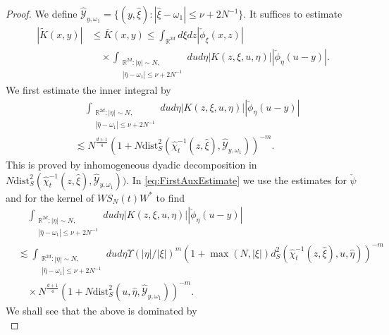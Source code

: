 \documentclass{amsart}
\numberwithin{equation}{section}
\theoremstyle{definition}
\newcommand{\R}{\mathbb{R}}
\begin{document}
\begin{proof}
We define $\hat{\mathcal{Y}}_{y,\omega_1} = \{ (y,\hat{\xi}) : |\hat{\xi} - \omega_1| \leq \nu + 2 N^{-1} \} $. It suffices to estimate
\begin{equation*}
\begin{split}
    |\tilde{K}(x,y)| &\leq \bar{K}(x,y) \leq \int_{\R^{2d}} d\xi dz |\check{\phi}_{\xi}(x,z)| \\
    &\quad \times \int_{\substack{\R^{2d}: |\eta| \sim N, \\ |\hat{\eta} - \omega_1| \leq \nu + 2 N^{-1}}} du d\eta |K(z,\xi,u,\eta)| |\check{\phi}_{\eta}(u-y)|.
\end{split}
\end{equation*}
We first estimate the inner integral by
\begin{equation}
\label{eq:FirstAuxEstimate}
\begin{split}
    &\quad \int_{\substack{\R^{2d}: |\eta| \sim N, \\ |\hat{\eta} - \omega_1| \leq \nu + 2 N^{-1}}} du d\eta |K(z,\xi,u,\eta)| |\check{\phi}_{\eta}(u-y)| \\
    &\lesssim N^{\frac{d+1}{4}} (1 + N \text{dist}_S^2(\hat{\chi}_t^{-1}(z,\hat{\xi}),\hat{\mathcal{Y}}_{y,\omega_1}))^{-m}.
\end{split}
\end{equation}
This is proved by inhomogeneous dyadic decomposition in $N \text{dist}_S^2(\hat{\chi}_t^{-1}(z,\hat{\xi}),\hat{\mathcal{Y}}_{y,\omega_1}))$. In \eqref{eq:FirstAuxEstimate} we use the estimates for $\check{\psi}$ and for the kernel of $W S_N(t) W^*$ to find
\begin{equation*}
\begin{split}
    &\quad \int_{\substack{\R^{2d}: |\eta| \sim N, \\ |\hat{\eta} - \omega_1| \leq \nu + 2 N^{-1}}} du d\eta |K(z,\xi,u,\eta)| |\check{\phi}_{\eta}(u-y)| \\
    &\lesssim \int_{\substack{\R^{2d}: |\eta| \sim N, \\ |\hat{\eta} - \omega_1| \leq \nu + 2 N^{-1}}} du d\eta \Upsilon(|\eta|/|\xi|)^m (1+ \max(N,|\xi|) d_S^2(\hat{\chi}_t^{-1}(z,\hat{\xi}),u,\hat{\eta}))^{-m} \\
    &\quad \times N^{\frac{d+1}{4}} (1+ N \text{dist}_S^2(u,\hat{\eta},\hat{\mathcal{Y}}_{y,\omega_1}))^{-m}.
\end{split}
\end{equation*}
We shall see that the above is dominated by
\begin{equation*}

\end{equation*}
\end{proof}
\end{document}
